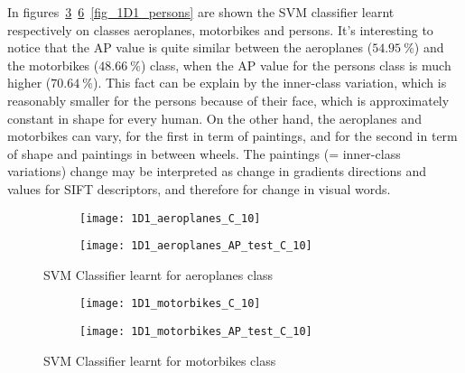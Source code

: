 \documentclass{article}
\begin{document}
In figures~\ref{fig_1D1_aeroplanes}~\ref{fig_1D1_motorbikes}~\ref{fig_1D1_persons} are shown the SVM classifier learnt respectively on classes aeroplanes, motorbikes and persons. It's interesting to notice that the AP value is quite similar between the aeroplanes (\(54.95~\%\)) and the motorbikes (\(48.66~\%\)) class, when the AP value for the persons class is much higher (\(70.64~\%\)). This fact can be explain by the inner-class variation, which is reasonably smaller for the persons because of their face, which is approximately constant in shape for every human. On the other hand, the aeroplanes and motorbikes can vary, for the first in term of paintings, and for the second in term of shape and paintings in between wheels. The paintings (= inner-class variations) change may be interpreted as change in gradients directions and values for SIFT descriptors, and therefore for change in visual words.

\begin{figure}[ht!]
	\centering
	\begin{subfigure}[b]{\textwidth}
		\centering
		\texttt{[image: 1D1\_aeroplanes\_C\_10]}
		\label{fig_1D1_aeroplanes_a}
	\end{subfigure}
	\begin{subfigure}[b]{0.8\textwidth}
		\centering
		\texttt{[image: 1D1\_aeroplanes\_AP\_test\_C\_10]}
		\label{fig_1D1_aeroplanes_b}
	\end{subfigure}
	\caption{SVM Classifier learnt for aeroplanes class}
	\label{fig_1D1_aeroplanes}
\end{figure}

\begin{figure}[ht!]
	\centering
	\begin{subfigure}[b]{\textwidth}
		\centering
		\texttt{[image: 1D1\_motorbikes\_C\_10]}
		\label{fig_1D1_motorbikes_a}
	\end{subfigure}
	\begin{subfigure}[b]{0.8\textwidth}
		\centering
		\texttt{[image: 1D1\_motorbikes\_AP\_test\_C\_10]}
		\label{fig_1D1_motorbikes_b}
	\end{subfigure}
	\caption{SVM Classifier learnt for motorbikes class}
	\label{fig_1D1_motorbikes}
\end{figure}
\end{document}

